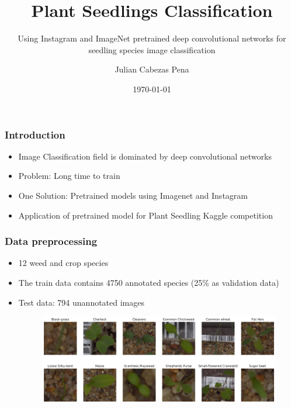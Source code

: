 \documentclass{beamer}
\title{Plant Seedlings Classification}
\subtitle{Using Instagram and ImageNet pretrained deep convolutional networks for seedling species image classification}
\author{Julian Cabezas Pena}
\institute{a1785086}
\date{\today}
\begin{document}
	
\begin{frame}
	\titlepage
\end{frame}	


\begin{frame}
	\frametitle{Introduction}
	
	\begin{itemize}
		\item Image Classification field is dominated by deep convolutional networks
		\item Problem: Long time to train
		\item One Solution: Pretrained models using Imagenet and Instagram
		\item Application of pretrained model for Plant Seedling Kaggle competition
	\end{itemize}
	
\end{frame}

\begin{frame}
	
	\frametitle{Data preprocessing}
	
	\begin{itemize}
		\item 12 weed and crop species 
		\item The train data contains 4750 annotated species (25\% as validation data)
		\item Test data: 794 unannotated images
		
		\begin{figure}[h]
			\begin{center}
				\includegraphics[width=1.0\linewidth]{samples_images.pdf}
			\end{center}
			\label{fig:samples}
		\end{figure}

		
	\end{itemize}
	
\end{frame}
\end{document}
